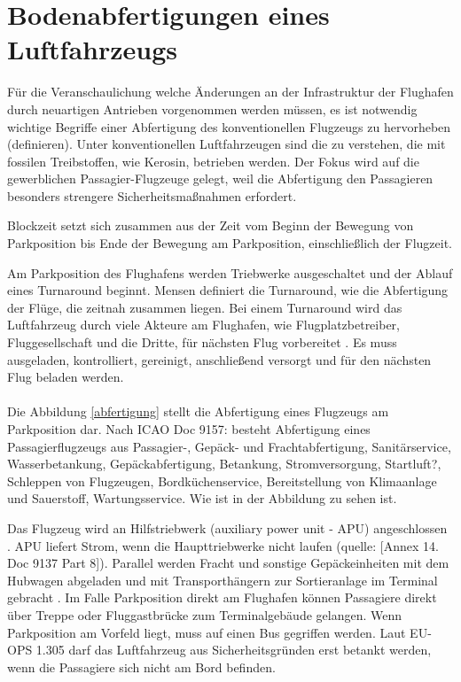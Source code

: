 \section{Bodenabfertigungen eines Luftfahrzeugs}
\label{s:Bodenabfertigungen eines Luftfahrzeugs}

Für die Veranschaulichung welche Änderungen an der Infrastruktur der Flughafen durch neuartigen Antrieben vorgenommen werden müssen, 
es ist notwendig wichtige Begriffe einer Abfertigung des konventionellen Flugzeugs zu hervorheben (definieren). 
Unter konventionellen Luftfahrzeugen sind die zu verstehen,
die mit fossilen Treibstoffen, wie Kerosin, betrieben werden. Der Fokus wird auf die gewerblichen Passagier-Flugzeuge gelegt,
weil die Abfertigung den Passagieren besonders strengere Sicherheitsmaßnahmen erfordert.


Blockzeit setzt sich zusammen aus der Zeit vom Beginn der Bewegung von Parkposition bis Ende der Bewegung am Parkposition, 
einschließlich der Flugzeit.

Am Parkposition des Flughafens werden Triebwerke ausgeschaltet und der Ablauf eines Turnaround beginnt. 
Mensen \cite{mensen2013handbuch} definiert die Turnaround, wie die Abfertigung der Flüge, die zeitnah zusammen liegen.
Bei einem Turnaround wird das Luftfahrzeug durch viele Akteure am Flughafen, wie Flugplatzbetreiber, Fluggesellschaft und die Dritte, für 
nächsten Flug vorbereitet \cite{mensen2013handbuch}. Es muss ausgeladen, kontrolliert, gereinigt, anschließend versorgt 
und für den nächsten Flug beladen werden. \\
\\
Die Abbildung \ref{abfertigung} stellt die Abfertigung eines Flugzeugs am Parkposition dar.
Nach ICAO Doc 9157: besteht Abfertigung eines Passagierflugzeugs aus Passagier-, Gepäck- und Frachtabfertigung, 
Sanitärservice, Wasserbetankung, Gepäckabfertigung, Betankung, Stromversorgung,
Startluft?, Schleppen von Flugzeugen, Bordküchenservice, Bereitstellung von Klimaanlage und Sauerstoff, Wartungsservice. 
Wie ist in der Abbildung zu sehen ist.

Das Flugzeug wird an Hilfstriebwerk (auxiliary power unit - APU) angeschlossen \cite{mensen2013handbuch}. 
APU liefert Strom, wenn die Haupttriebwerke nicht laufen (quelle: [Annex 14. Doc 9137 Part 8]).
Parallel werden Fracht und sonstige Gepäckeinheiten mit dem Hubwagen abgeladen und mit Transporthängern zur Sortieranlage 
im Terminal gebracht \cite{mensen2013handbuch}. Im Falle Parkposition direkt am Flughafen können Passagiere direkt über Treppe oder Fluggastbrücke 
zum Terminalgebäude gelangen. Wenn Parkposition am Vorfeld liegt, muss auf einen Bus gegriffen werden. 
Laut EU-OPS 1.305 darf das Luftfahrzeug aus Sicherheitsgründen erst betankt werden, wenn die Passagiere sich nicht am Bord befinden. 

